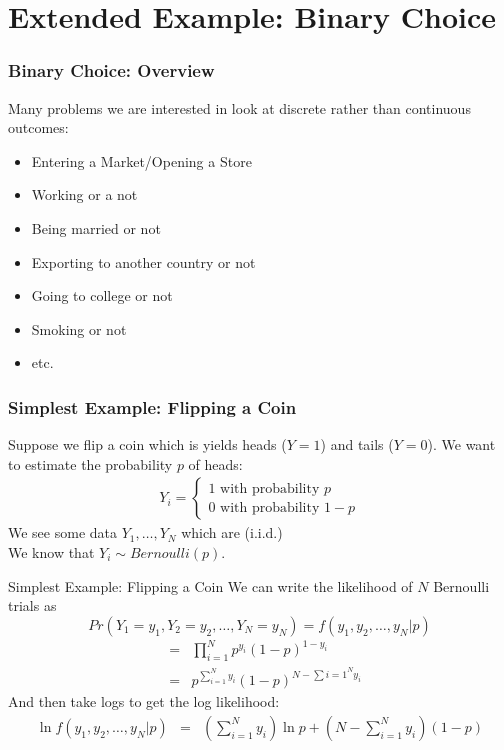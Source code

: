 \documentclass[aspectratio=169]{beamer}
\begin{document}
\section{Extended Example: Binary Choice}
\begin{frame}
\frametitle{Binary Choice: Overview}
Many problems we are interested in look at discrete rather than continuous outcomes:
\begin{itemize}
\item Entering a Market/Opening a Store
\item Working or a not
\item Being married or not
\item Exporting to another country or not
\item Going to college or not
\item Smoking or not
\item etc.
\end{itemize}
\end{frame}

\begin{frame}
\frametitle{Simplest Example: Flipping a Coin}
Suppose we flip a coin which is yields heads ($Y=1$) and tails ($Y=0$). We want to estimate the probability $p$ of heads:
\begin{eqnarray*}
Y_i =
\begin{cases}
1 \mbox{ with probability } p \\
0 \mbox{ with probability } 1-p
\end{cases}
\end{eqnarray*}
We see some data $Y_1,\ldots,Y_N$ which are (i.i.d.)\\
\vspace{0.2cm}
We know that $Y_i \sim Bernoulli(p)$.
\end{frame}


\begin{frame}{Simplest Example: Flipping a Coin}
We can write the likelihood of $N$ Bernoulli trials as 
$$Pr(Y_1 = y_1, Y_2=y_2,\ldots,Y _N=y_N )  =  f(y_1,y_2,\ldots,y_N | p ) $$
\begin{eqnarray*}
&=& \prod_{i=1}^N p^{y_i} (1-p)^{1-y_i}\\
&=& p^{\sum_{i=1}^N y_i} (1-p)^{N-\sum{i=1}^N y_i}
\end{eqnarray*}
And then take logs to get the \alert{log likelihood}:
\begin{eqnarray*}
\ln  f(y_1,y_2,\ldots,y_N | p )  &=& \left( \sum_{i=1}^N y_i \right)  \ln p  + \left(N-\sum_{i=1}^N y_i \right)  (1-p)
\end{eqnarray*}
\end{frame}
\end{document}
